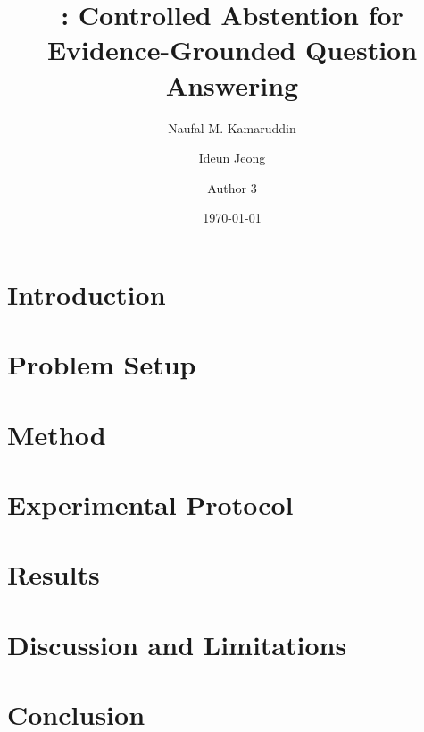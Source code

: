 \documentclass[11pt,twocolumn]{article}
\title{\system: Controlled Abstention for Evidence-Grounded Question Answering}
\author{
  Naufal M. Kamaruddin \and
  Ideun Jeong \and
  Author 3
}
\date{\today}
\begin{document}
\maketitle



\section{Introduction}


\section{Problem Setup}


\section{Method}


\section{Experimental Protocol}


\section{Results}


\section{Discussion and Limitations}


\section{Conclusion}




\end{document}
